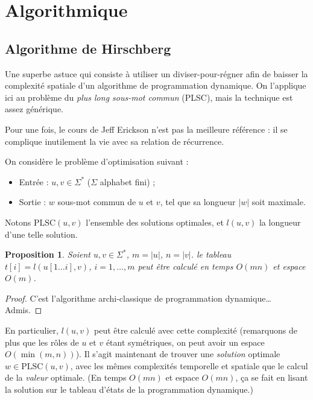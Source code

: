 \documentclass[a4paper, 11pt]{article}
\newtheorem*{proposition}{Proposition}
\begin{document}
\section{Algorithmique}

\subsection{Algorithme de Hirschberg}

Une superbe astuce qui consiste à utiliser un diviser-pour-régner afin de
baisser la complexité spatiale d'un algorithme de programmation dynamique. On
l'applique ici au problème du \emph{plus long sous-mot commun} (PLSC), mais la
technique est assez générique.

Pour une fois, le cours de Jeff Erickson n'est pas la meilleure référence : il
se complique inutilement la vie avec sa relation de récurrence.

On considère le problème d'optimisation suivant :
\begin{itemize}
\item Entrée : $u, v \in \Sigma^*$ ($\Sigma$ alphabet fini) ;
\item Sortie : $w$ sous-mot commun de $u$ et $v$, tel que sa longueur $|w|$ soit
  maximale.
\end{itemize}
Notons $\mathrm{PLSC}(u,v)$ l'ensemble des solutions optimales, et $l(u,v)$ la
longueur d'une telle solution.

\begin{proposition}
  Soient $u, v \in \Sigma^*$, $m = |u|$, $n = |v|$. le tableau $t[i] = l(u[1 …
  i], v)$, $i = 1, …, m$ peut être calculé en temps $O(mn)$ et espace $O(m)$.
\end{proposition}
\begin{proof}
  C'est l'algorithme archi-classique de programmation dynamique… Admis.
\end{proof}

En particulier, $l(u,v)$ peut être calculé avec cette complexité (remarquons de
plus que les rôles de $u$ et $v$ étant symétriques, on peut avoir un espace
$O(\min(m,n))$). Il s'agit maintenant de trouver une \emph{solution} optimale $w
\in \mathrm{PLSC}(u,v)$, avec les mêmes complexités temporelle et spatiale que
le calcul de la \emph{valeur} optimale. (En temps $O(mn)$ et espace $O(mn)$, ça
se fait en lisant la solution sur le tableau d'états de la programmation
dynamique.)
\end{document}
